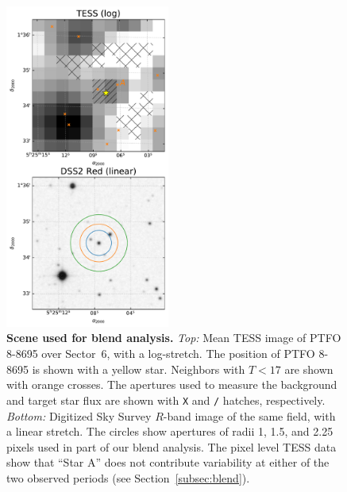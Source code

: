 \documentclass[12pt,twocolumn,tighten]{aastex62}
\begin{document}
\begin{figure}[t]
	\begin{center}
		\leavevmode
		\includegraphics[width=0.48\textwidth]{f3.pdf}
	\end{center}
	\vspace{-0.7cm}
	\caption{ {\bf Scene used for blend analysis.}
		{\it Top:} Mean TESS image of PTFO 8-8695 over Sector~6, with a log-stretch.
		The position of PTFO 8-8695 is shown with a yellow star.
		Neighbors with $T<17$ are shown with orange crosses.
		The apertures used to measure the background and target star flux
		are shown with \texttt{X} and \texttt{/} hatches, respectively.
		{\it Bottom:} Digitized Sky Survey $R$-band image of the same field, with a linear stretch. The circles show
		apertures of radii 1, 1.5, and 2.25 pixels used in part of our blend
		analysis.
		The pixel level TESS data show that ``Star A''  does not contribute variability at either of the two observed periods (see Section~\ref{subsec:blend}).
		\label{fig:scene}
	}
\end{figure}
\end{document}
